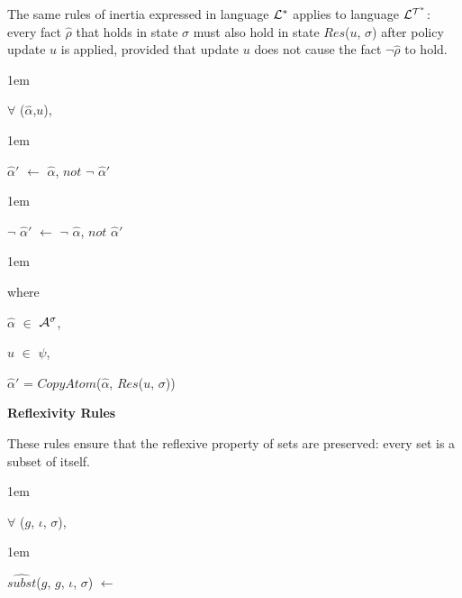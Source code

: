 \documentclass[11pt]{report}
\newenvironment{vquote}
{
  \begin{list}{}{\leftmargin 1em}\item[]
}
{
  \end{list}
}
\begin{document}
\begin{itemize}
              The same rules of inertia expressed in language ${\cal L^*}$
              applies to language ${\cal L^{T^*}}$: every fact $\hat{\rho}$
              that holds in state $\sigma$ must also hold in state
              $Res$($u$, $\sigma$) after policy update $u$ is applied,
              provided that update $u$ does not cause the fact
              $\lnot\hat{\rho}$ to hold.

              \begin{vquote}
                $\forall$ ($\hat{\alpha}$,$u$),
              \end{vquote}

              \begin{vquote}
                $\hat{\alpha}'$
                $\leftarrow$
                $\hat{\alpha}$,
                $not$ $\lnot$ $\hat{\alpha}'$
              \end{vquote}

              \begin{vquote}
                $\lnot$ $\hat{\alpha}'$
                $\leftarrow$ $\lnot$
                $\hat{\alpha}$,
                $not$ $\hat{\alpha}'$
              \end{vquote}

              \begin{vquote}
                where

                \hspace{1em}
                $\hat{\alpha}$ $\in$ ${\cal A}^{\sigma}$,

                \hspace{1em}
                $u$ $\in$ $\psi$,

                \hspace{1em}
                $\hat{\alpha}'$ = $CopyAtom$($\hat{\alpha}$, $Res$($u$, $\sigma$))
              \end{vquote}

            \item
              {\bf Reflexivity Rules}

              These rules ensure that the reflexive property of sets are
              preserved: every set is a subset of itself.

              \begin{vquote}
                $\forall$ ($g$, $\iota$, $\sigma$),
              \end{vquote}

              \begin{vquote}
                $\hat{subst}$($g$, $g$, $\iota$, $\sigma$) $\leftarrow$
              \end{vquote}


\end{itemize}
\end{document}
